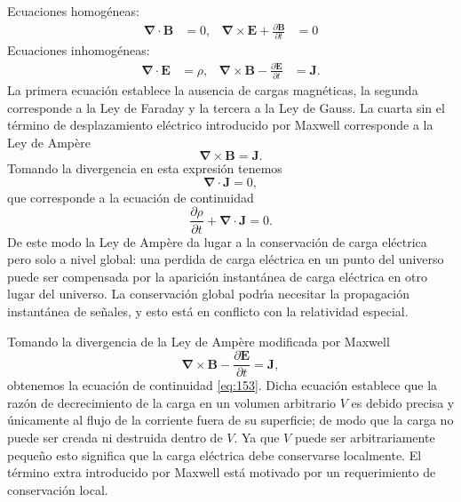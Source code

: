 Ecuaciones homogéneas:
\begin{align}
  \label{eq:hom_m_eq}
  \boldsymbol{\nabla}\cdot\mathbf{B}&=0,&\boldsymbol{\nabla}\times\mathbf{E}+\frac{\partial\mathbf{B}}{\partial t}&=0
\end{align}
Ecuaciones inhomog\'eneas:
\begin{align}
  \label{eq:inhom_m_eq}
  \boldsymbol{\nabla}\cdot\mathbf{E}&=\rho,&\boldsymbol{\nabla}\times\mathbf{B}-\frac{\partial\mathbf{E}}{\partial t}&=\mathbf{J}.
\end{align}
La primera ecuaci\'on establece la ausencia de cargas magn\'eticas, la segunda corresponde a la Ley de Faraday y la tercera a la Ley de Gauss. La cuarta sin el t\'ermino de desplazamiento el\'ectrico introducido por Maxwell corresponde a la Ley de Amp\`ere
\begin{equation}
   \boldsymbol{\nabla}\times\mathbf{B}=\mathbf{J}.
\end{equation}
Tomando la divergencia en esta expresi\'on tenemos
\begin{equation}
  \boldsymbol{\nabla}\cdot\mathbf{J}=0,
\end{equation}
que corresponde a la ecuación de continuidad
\begin{equation}
  \label{eq:153}
  \frac{\partial \rho}{\partial t}+\boldsymbol{\nabla}\cdot\mathbf{J}=0.
\end{equation}
De este modo la Ley de Amp\`ere da lugar a la conservaci\'on de carga el\'ectrica pero solo a nivel global:  una perdida de carga el\'ectrica en un punto del universo puede ser compensada por la aparici\'on instant\'anea de carga el\'ectrica en otro lugar del universo. La conservaci\'on global podr\'\i a necesitar la propagaci\'on instant\'anea de se\~nales, y esto est\'a en conflicto con la relatividad especial.


Tomando la divergencia de la Ley de Amp\`ere modificada por Maxwell
\begin{equation}
   \boldsymbol{\nabla}\times\mathbf{B}-\frac{\partial\mathbf{E}}{\partial t}=\mathbf{J},
\end{equation}
obtenemos la ecuaci\'on de continuidad \eqref{eq:153}. Dicha ecuaci\'on establece que la raz\'on de decrecimiento de la carga en un volumen arbitrario $V$ es debido precisa y \'unicamente al flujo de la corriente fuera de su superficie; de modo que la carga no puede ser creada ni destruida dentro de $V$.  Ya que $V$ puede ser arbitrariamente peque\~no esto significa que la carga el\'ectrica debe conservarse localmente.   El t\'ermino extra introducido por Maxwell est\'a motivado por un requerimiento de conservaci\'on local. 

